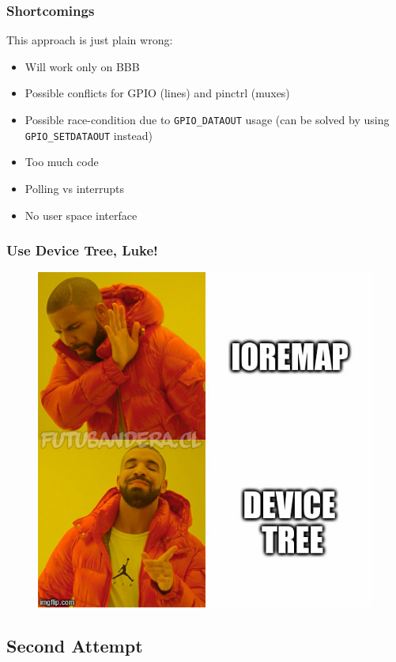 \documentclass[aspectratio=169,usenames,dvipsnames]{beamer}
\begin{document}
\begin{frame}
  \frametitle{Shortcomings}
  This approach is just plain wrong:
  \begin{itemize}
    \item Will work only on BBB
    \item Possible conflicts for GPIO (lines) and pinctrl (muxes)
    \item Possible race-condition due to \texttt{GPIO\_DATAOUT} usage (can be
          solved by using \texttt{GPIO\_SETDATAOUT} instead)
    \item Too much code
    \item Polling vs interrupts
    \item No user space interface
  \end{itemize}
\end{frame}

\begin{frame}
  \frametitle{Use Device Tree, Luke!}
  \begin{figure}
    \centering
    \includegraphics[scale=0.4]{images/ioremap-device-tree.jpg}
  \end{figure}
  \vspace*{-10mm}
\end{frame}

\subsection{Second Attempt}
\end{document}
